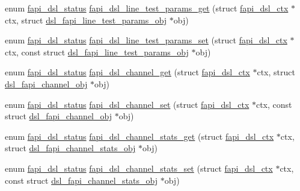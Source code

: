\begin{DoxyCompactItemize}
\item 
enum \hyperlink{group__FAPI__DSL_ga6a68d961535e6f7aa239751763131a70}{fapi\-\_\-dsl\-\_\-status} \hyperlink{group__FAPI__DSL_ga78485df8d97915a39de9002c00a92dbd}{fapi\-\_\-dsl\-\_\-line\-\_\-test\-\_\-params\-\_\-get} (struct \hyperlink{structfapi__dsl__ctx}{fapi\-\_\-dsl\-\_\-ctx} $\ast$ctx, struct \hyperlink{structdsl__fapi__line__test__params__obj}{dsl\-\_\-fapi\-\_\-line\-\_\-test\-\_\-params\-\_\-obj} $\ast$obj)
\item 
enum \hyperlink{group__FAPI__DSL_ga6a68d961535e6f7aa239751763131a70}{fapi\-\_\-dsl\-\_\-status} \hyperlink{group__FAPI__DSL_ga05a9932df17850cc4c198150b5912dce}{fapi\-\_\-dsl\-\_\-line\-\_\-test\-\_\-params\-\_\-set} (struct \hyperlink{structfapi__dsl__ctx}{fapi\-\_\-dsl\-\_\-ctx} $\ast$ctx, const struct \hyperlink{structdsl__fapi__line__test__params__obj}{dsl\-\_\-fapi\-\_\-line\-\_\-test\-\_\-params\-\_\-obj} $\ast$obj)
\item 
enum \hyperlink{group__FAPI__DSL_ga6a68d961535e6f7aa239751763131a70}{fapi\-\_\-dsl\-\_\-status} \hyperlink{group__FAPI__DSL_ga73a2b7430190378d727446880250d9bb}{fapi\-\_\-dsl\-\_\-channel\-\_\-get} (struct \hyperlink{structfapi__dsl__ctx}{fapi\-\_\-dsl\-\_\-ctx} $\ast$ctx, struct \hyperlink{structdsl__fapi__channel__obj}{dsl\-\_\-fapi\-\_\-channel\-\_\-obj} $\ast$obj)
\item 
enum \hyperlink{group__FAPI__DSL_ga6a68d961535e6f7aa239751763131a70}{fapi\-\_\-dsl\-\_\-status} \hyperlink{group__FAPI__DSL_gade76bf5f68ad4fad63a5189eab1b3a17}{fapi\-\_\-dsl\-\_\-channel\-\_\-set} (struct \hyperlink{structfapi__dsl__ctx}{fapi\-\_\-dsl\-\_\-ctx} $\ast$ctx, const struct \hyperlink{structdsl__fapi__channel__obj}{dsl\-\_\-fapi\-\_\-channel\-\_\-obj} $\ast$obj)
\item 
enum \hyperlink{group__FAPI__DSL_ga6a68d961535e6f7aa239751763131a70}{fapi\-\_\-dsl\-\_\-status} \hyperlink{group__FAPI__DSL_ga09a5f81b49d36ad57136c6e29b06d27d}{fapi\-\_\-dsl\-\_\-channel\-\_\-stats\-\_\-get} (struct \hyperlink{structfapi__dsl__ctx}{fapi\-\_\-dsl\-\_\-ctx} $\ast$ctx, struct \hyperlink{structdsl__fapi__channel__stats__obj}{dsl\-\_\-fapi\-\_\-channel\-\_\-stats\-\_\-obj} $\ast$obj)
\item 
enum \hyperlink{group__FAPI__DSL_ga6a68d961535e6f7aa239751763131a70}{fapi\-\_\-dsl\-\_\-status} \hyperlink{group__FAPI__DSL_ga30e905b23b61cfcea70a8f294aeebfc0}{fapi\-\_\-dsl\-\_\-channel\-\_\-stats\-\_\-set} (struct \hyperlink{structfapi__dsl__ctx}{fapi\-\_\-dsl\-\_\-ctx} $\ast$ctx, const struct \hyperlink{structdsl__fapi__channel__stats__obj}{dsl\-\_\-fapi\-\_\-channel\-\_\-stats\-\_\-obj} $\ast$obj)

\end{DoxyCompactItemize}
